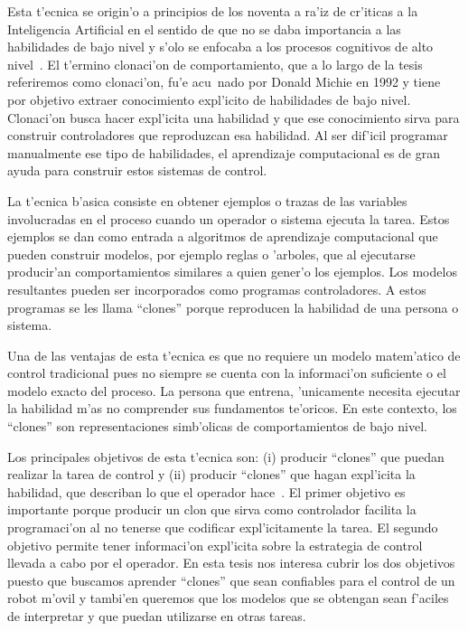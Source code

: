 \documentclass[11pt]{article}
\begin{document}
Esta t'ecnica se origin'o a principios de los noventa a ra'iz de cr'iticas a la Inteligencia Artificial en el sentido de que no se daba importancia a las habilidades de bajo nivel y s'olo se enfocaba a los procesos cognitivos de alto nivel~\cite{michiesammut:cloning}. El t'ermino \textsf{clonaci'on de comportamiento}, que a lo largo de la tesis referiremos como \textsf{clonaci'on}, fu'e acu~nado por Donald Michie en 1992 y tiene por objetivo extraer conocimiento expl'icito de habilidades de bajo nivel. \textsf{Clonaci'on} busca hacer expl'icita una habilidad y que ese conocimiento sirva para construir controladores que reproduzcan esa habilidad. Al ser dif'icil programar manualmente ese tipo de habilidades, el aprendizaje computacional es de gran ayuda para construir estos sistemas de control.

La t'ecnica b'asica consiste en obtener ejemplos o trazas de las variables involucradas en el proceso cuando un operador o sistema ejecuta la tarea. Estos ejemplos se dan como entrada a algoritmos de aprendizaje computacional que pueden construir modelos, por ejemplo reglas o 'arboles, que al ejecutarse producir'an comportamientos similares a quien gener'o los ejemplos. Los modelos resultantes pueden ser incorporados como programas controladores. A estos programas se les llama ``clones'' porque reproducen la habilidad de una persona o sistema.

Una de las ventajas de esta t'ecnica es que no requiere un modelo matem'atico de control tradicional pues no siempre se cuenta con la informaci'on suficiente o el modelo exacto del proceso. La persona que entrena, 'unicamente necesita ejecutar la habilidad m'as no comprender sus fundamentos te'oricos. En este contexto, los ``clones'' son representaciones simb'olicas de comportamientos de bajo nivel. 

Los principales objetivos de esta t'ecnica son: (i) producir ``clones'' que puedan realizar la tarea de control y (ii) producir ``clones'' que hagan expl'icita la habilidad, que describan lo que el operador hace~\cite{modellingskills}. El primer objetivo es importante porque producir un clon que sirva como controlador facilita la programaci'on al no tenerse que codificar expl'icitamente la tarea. El segundo objetivo permite tener informaci'on expl'icita sobre la estrategia de control llevada a cabo por el operador. En esta tesis nos interesa cubrir los dos objetivos puesto que buscamos aprender ``clones'' que sean confiables para el control de un robot m'ovil y tambi'en queremos que los modelos que se obtengan sean f'aciles de interpretar y que puedan utilizarse en otras tareas.  
\end{document}
